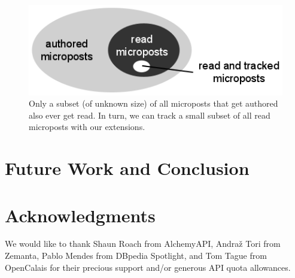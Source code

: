 \documentclass{iosart2c}
\begin{document}
\begin{figure}
\centering
\includegraphics[width=0.6\linewidth]{./resources/vennreadunread.png}
\caption{Only a subset (of unknown size) of all microposts that get authored also ever get read. In turn, we can track a small subset of all read microposts with our extensions.}
\label{fig:vennreadunread}
\end{figure}

\section{Future Work and Conclusion} \label{sec:futureworkandconclusion}

\section*{Acknowledgments}
We would like to thank Shaun Roach from AlchemyAPI, Andraž Tori from Zemanta, Pablo Mendes from DBpedia Spotlight, and Tom Tague from OpenCalais for their precious support and/or generous API quota allowances. 



\end{document}
